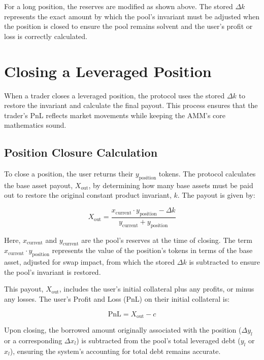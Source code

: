 \documentclass[11pt]{article}
\begin{document}
For a long position, the reserves are modified as shown above. The stored $\Delta k$ represents the exact amount by which the pool's invariant must be adjusted when the position is closed to ensure the pool remains solvent and the user's profit or loss is correctly calculated.

\section{Closing a Leveraged Position}

When a trader closes a leveraged position, the protocol uses the stored $\Delta k$ to restore the invariant and calculate the final payout. This process ensures that the trader's PnL reflects market movements while keeping the AMM's core mathematics sound.

\subsection{Position Closure Calculation}

To close a position, the user returns their $y_{\text{position}}$ tokens. The protocol calculates the base asset payout, $X_{\text{out}}$, by determining how many base assets must be paid out to restore the original constant product invariant, $k$. The payout is given by:

\begin{equation}
X_{\text{out}} = \frac{x_{\text{current}} \cdot y_{\text{position}} - \Delta k}{y_{\text{current}} + y_{\text{position}}}
\end{equation}

Here, $x_{\text{current}}$ and $y_{\text{current}}$ are the pool's reserves at the time of closing. The term $x_{\text{current}} \cdot y_{\text{position}}$ represents the value of the position's tokens in terms of the base asset, adjusted for swap impact, from which the stored $\Delta k$ is subtracted to ensure the pool's invariant is restored.

This payout, $X_{\text{out}}$, includes the user's initial collateral plus any profits, or minus any losses. The user's Profit and Loss (PnL) on their initial collateral is:

\begin{equation}
\text{PnL} = X_{\text{out}} - c
\end{equation}

Upon closing, the borrowed amount originally associated with the position ($\Delta y_l$ or a corresponding $\Delta x_l$) is subtracted from the pool's total leveraged debt ($y_l$ or $x_l$), ensuring the system's accounting for total debt remains accurate.
\end{document}

